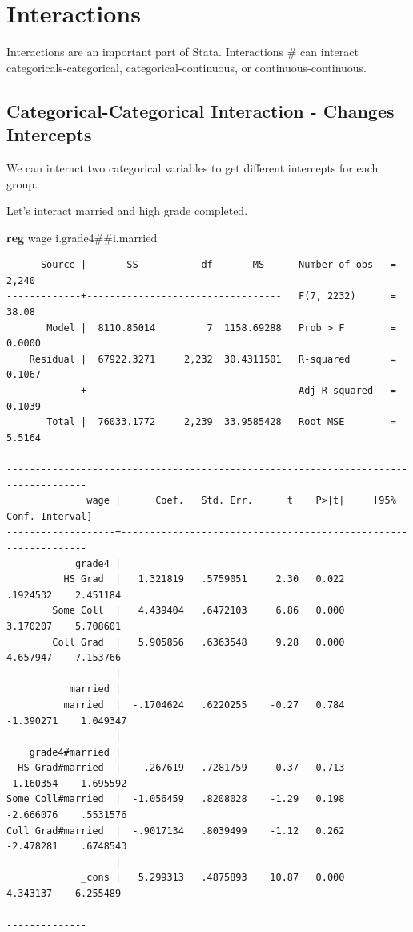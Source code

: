 \documentclass[
]{book}
\newenvironment{Shaded}{\begin{snugshade}}{\end{snugshade}}
\newcommand{\KeywordTok}[1]{\textcolor[rgb]{0.13,0.29,0.53}{\textbf{#1}}}
\newcommand{\NormalTok}[1]{#1}
\begin{document}
\section{Interactions}\label{interactions}

Interactions are an important part of Stata. Interactions \# can interact categoricals-categorical, categorical-continuous, or continuous-continuous.

\subsection{Categorical-Categorical Interaction - Changes Intercepts}\label{categorical-categorical-interaction---changes-intercepts}

We can interact two categorical variables to get different intercepts for each group.

Let's interact married and high grade completed.

\begin{Shaded}
\begin{Highlighting}[]
\KeywordTok{reg}\NormalTok{ wage i.grade4\#\#i.married}
\end{Highlighting}
\end{Shaded}

\begin{verbatim}
      Source |       SS           df       MS      Number of obs   =     2,240
-------------+----------------------------------   F(7, 2232)      =     38.08
       Model |  8110.85014         7  1158.69288   Prob > F        =    0.0000
    Residual |  67922.3271     2,232  30.4311501   R-squared       =    0.1067
-------------+----------------------------------   Adj R-squared   =    0.1039
       Total |  76033.1772     2,239  33.9585428   Root MSE        =    5.5164

------------------------------------------------------------------------------------
              wage |      Coef.   Std. Err.      t    P>|t|     [95% Conf. Interval]
-------------------+----------------------------------------------------------------
            grade4 |
          HS Grad  |   1.321819   .5759051     2.30   0.022     .1924532    2.451184
        Some Coll  |   4.439404   .6472103     6.86   0.000     3.170207    5.708601
        Coll Grad  |   5.905856   .6363548     9.28   0.000     4.657947    7.153766
                   |
           married |
          married  |  -.1704624   .6220255    -0.27   0.784    -1.390271    1.049347
                   |
    grade4#married |
  HS Grad#married  |    .267619   .7281759     0.37   0.713    -1.160354    1.695592
Some Coll#married  |  -1.056459   .8208028    -1.29   0.198    -2.666076    .5531576
Coll Grad#married  |  -.9017134   .8039499    -1.12   0.262    -2.478281    .6748543
                   |
             _cons |   5.299313   .4875893    10.87   0.000     4.343137    6.255489
------------------------------------------------------------------------------------
\end{verbatim}
\end{document}
